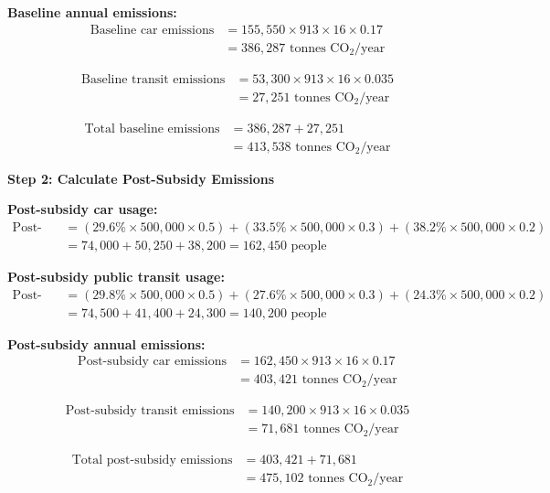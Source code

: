 \textbf{Baseline annual emissions:}
\begin{align}
\text{Baseline car emissions} &= 155,550 \times 913 \times 16 \times 0.17 \\
&=386,287 \text{ tonnes CO}_2\text{/year}
\end{align}

\begin{align}
\text{Baseline transit emissions} &= 53,300 \times 913 \times 16 \times 0.035 \\
&= 27,251 \text{ tonnes CO}_2\text{/year}
\end{align}

\begin{align}
\text{Total baseline emissions} &= 386,287 + 27,251 \\
&= 413,538 \text{ tonnes CO}_2\text{/year}
\end{align}

\textbf{Step 2: Calculate Post-Subsidy Emissions}

\textbf{Post-subsidy car usage:}
\begin{align}
\text{Post-subsidy car users} &= (29.6\% \times 500,000\times0.5) + (33.5\% \times 500,000\times0.3) + (38.2\% \times 500,000\times0.2) \\
&= 74,000 + 50,250 + 38,200 = 162,450 \text{ people}
\end{align}

\textbf{Post-subsidy public transit usage:}
\begin{align}
\text{Post-subsidy transit users} &= (29.8\% \times 500,000\times0.5) + (27.6\% \times 500,000\times0.3) + (24.3\% \times 500,000\times0.2) \\
&=74,500 + 41,400 + 24,300 = 140,200 \text{ people}
\end{align}

\textbf{Post-subsidy annual emissions:}
\begin{align}
\text{Post-subsidy car emissions} &= 162,450 \times 913 \times 16 \times 0.17 \\
&= 403,421 \text{ tonnes CO}_2\text{/year}
\end{align}

\begin{align}
\text{Post-subsidy transit emissions} &= 140,200 \times 913 \times 16 \times 0.035 \\
&= 71,681 \text{ tonnes CO}_2\text{/year}
\end{align}

\begin{align}
\text{Total post-subsidy emissions} &= 403,421 + 71,681 \\
&= 475,102 \text{ tonnes CO}_2\text{/year}
\end{align}

